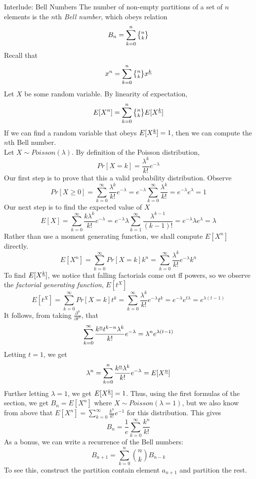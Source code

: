 \begin{subsection}{Interlude: Bell Numbers}
The number of non-empty partitions of a set of $n$ elements is the $n$th \emph{Bell number}, which obeys relation
$$B_n = \sum_{k=0}^n \stirii{n}{k}$$
Recall that
$$x^n = \sum_{k=0}^n \stirii{n}{k} x\fallingfactorial{k}$$
Let $X$ be some random variable. By linearity of expectation,
$$E[X^n] = \sum_{k=0}^n \stirii{n}{k}E[X\fallingfactorial{k}]$$
If we can find a random variable that obeys
$E[X^{\underline{k}}] = 1$, then we can compute the $n$th Bell number. \\
Let $X \sim Poisson(\lambda)$. By definition of the Poisson distribution,
$$Pr[X=k] = \frac{\lambda^k}{k!}e^{-\lambda}$$
Our first step is to prove that this a valid probability distribution. Observe
$$Pr[X\geq 0] = \sum_{k=0}^\infty \frac{\lambda^k}{k!}e^{-\lambda} = e^{-\lambda}\sum_{k=0}^\infty \frac{\lambda^k}{k!} = e^{-\lambda}e^\lambda = 1$$
Our next step is to find the expected value of $X$
$$E[X] = \sum_{k=0}^\infty \frac{k\lambda^k}{k!}e^{-\lambda} = e^{-\lambda}\lambda\sum_{k=1}^\infty \frac{\lambda^{k-1}}{(k-1)!} = e^{-\lambda}\lambda e^{\lambda} = \lambda$$
Rather than use a moment generating function, we shall compute $E[X^n]$ directly.
$$E[X^n] = \sum_{k=0}^\infty Pr[X=k]k^n = \sum_{k=0}^\infty \frac{\lambda^k}{k!}e^{-\lambda}k^n$$
To find $E[X^{\underline{k}}]$, we notice that falling factorials come out ff powers, so we observe the \emph{factorial generating function}, $E[t^X]$
$$E[t^X] = \sum_{k=0}^\infty Pr[X=k]t^k = \sum_{k=0}^\infty \frac{\lambda^k}{k!}e^{-\lambda}t^k = e^{-\lambda}e^{t\lambda} = e^{\lambda(t-1)}$$
It follows, from taking $\frac{\partial^n}{\partial t^n}$, that
$$\sum_{k=0}^\infty \frac{k^{\underline{n}} t^{k-n}\lambda^k}{k!}e^{-\lambda} = \lambda^n e^{\lambda(t-1)}$$
Letting $t=1$, we get
$$\lambda^n = \sum_{k=0}^n \frac{k^{\underline{n}}\lambda^k}{k!}e^{-\lambda} = E[X^{\underline{n}}]$$
Further letting $\lambda =1$, we get $E[X^{\underline{k}}] = 1$. Thus, using the first formulas of the section, we get $B_n = E[X^n]$ where $X\sim Poisson(\lambda=1)$, but we also know from above that $E[X^n] = \sum_{k=0}^\infty \frac{k^n}{k!}e^{-1}$ for this distribution. This gives
$$B_n = \frac{1}{e}\sum_{k=0}^\infty \frac{k^n}{k!}$$
As a bonus, we can write a recurrence of the Bell numbers:
$$B_{n+1} = \sum_{k=0}^n \binom n kB_{n-k}$$
To see this, construct the partition contain element $a_{n+1}$ and partition the rest.
\end{subsection}
% 
